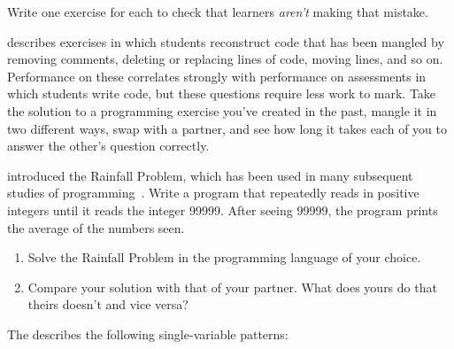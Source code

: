 \noindent
Write one exercise for each to check that learners \emph{aren't} making that mistake.


\cite{Chen2017} describes exercises in which students reconstruct code that has been mangled
by removing comments,
deleting or replacing lines of code,
moving lines,
and so on.
Performance on these correlates strongly with performance on assessments
in which students write code,
but these questions require less work to mark.
Take the solution to a programming exercise you've created in the past,
mangle it in two different ways,
swap with a partner,
and see how long it takes each of you to answer the other's question correctly.


\cite{Solo1986} introduced the Rainfall Problem,
which has been used in many subsequent studies of programming~\cite{Fisl2014,Simo2013,Sepp2015}.
Write a program that repeatedly reads in positive integers until it reads the integer 99999.
After seeing 99999,
the program prints the average of the numbers seen.

\begin{enumerate}

\item
  Solve the Rainfall Problem in the programming language of your choice.

\item
  Compare your solution with that of your partner.
  What does yours do that theirs doesn't and vice versa?

\end{enumerate}


The 
describes the following single-variable patterns:

